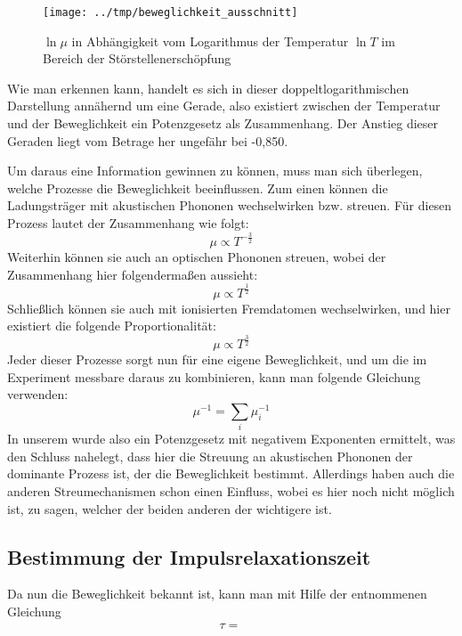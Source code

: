 \begin{figure}[htb]
   \centering
   \texttt{[image: ../tmp/beweglichkeit\_ausschnitt]}
   \caption{$\ln μ$ in Abhängigkeit vom Logarithmus der Temperatur $\ln T$ im Bereich der Störstellenerschöpfung}
   \label{fig:beweglichkeit_ausschnitt}
\end{figure}

Wie man erkennen kann, handelt es sich in dieser doppeltlogarithmischen
Darstellung annähernd um eine Gerade, also existiert zwischen der Temperatur
und der Beweglichkeit ein Potenzgesetz als Zusammenhang. Der Anstieg dieser
Geraden liegt vom Betrage her ungefähr bei -0,850.

Um daraus eine Information gewinnen zu können, muss man sich überlegen, welche
Prozesse die Beweglichkeit beeinflussen. Zum einen können die Ladungsträger mit
akustischen Phononen wechselwirken bzw. streuen. Für diesen Prozess lautet der
Zusammenhang wie folgt:
\begin{equation}
μ \propto T^{-\frac{3}{2}}
\end{equation}
Weiterhin können sie auch an optischen Phononen streuen, wobei der Zusammenhang
hier folgendermaßen aussieht:
\begin{equation}
μ \propto T^{\frac{1}{2}}
\end{equation}
Schließlich können sie auch mit ionisierten Fremdatomen wechselwirken, und hier
existiert die folgende Proportionalität:
\begin{equation}
μ \propto T^{\frac{3}{2}}
\end{equation}
Jeder dieser Prozesse sorgt nun für eine eigene Beweglichkeit, und um die im
Experiment messbare daraus zu kombinieren, kann man folgende Gleichung
verwenden:
\begin{equation}
μ^{-1} = \sum_i μ_i^{-1}
\end{equation}
In unserem wurde also ein Potenzgesetz mit negativem Exponenten ermittelt, was
den Schluss nahelegt, dass hier die Streuung an akustischen Phononen der
dominante Prozess ist, der die Beweglichkeit bestimmt. Allerdings haben auch
die anderen Streumechanismen schon einen Einfluss, wobei es hier noch nicht
möglich ist, zu sagen, welcher der beiden anderen der wichtigere ist.

\subsection{Bestimmung der Impulsrelaxationszeit}

Da nun die Beweglichkeit bekannt ist, kann man mit Hilfe der \cite[Gl.
(6.37)]{bergmann} entnommenen Gleichung
\begin{equation}
τ = \frac{}{}
\end{equation}
